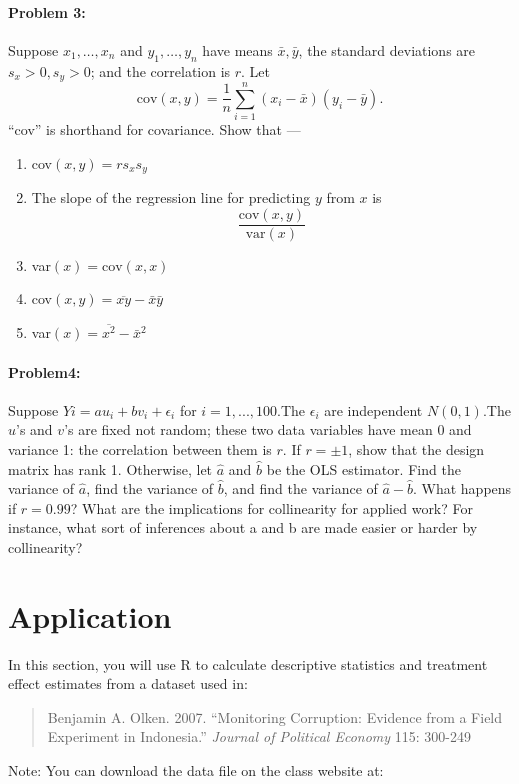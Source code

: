 \documentclass{article}
\begin{document}
\paragraph{Problem 3:}
\renewcommand{\theenumi}{\alph{enumi}}
Suppose $x_1, \ldots, x_n$ and $y_1,\ldots,y_n$ have means $\bar x, \bar y$, the standard deviations are $s_x>0, s_y>0$; and the correlation is $r$. Let
$$
\textrm{cov}(x,y) = \frac{1}{n}\sum_{i=1}^n (x_i - \bar x) (y_i - \bar y).
$$
``cov'' is shorthand for covariance. Show that ---
\begin{enumerate}
\item cov$(x,y) = rs_xs_y$
\item The slope of the regression line for predicting $y$ from $x$ is 
$$
\frac{\textrm{cov}(x,y)}{\textrm{var}(x)}
$$
\item var$(x)=\textrm{cov}(x,x)$
\item cov$(x,y) = \overline{xy} - \bar x \bar y$
\item var$(x) = \overline{x^2} -\bar x^2$
\end{enumerate}

\paragraph{Problem4:} 
\renewcommand{\theenumi}{\alph{enumi}} Suppose
$Yi=au_i+bv_i+\epsilon_i$ for $i=1,...,100$.The $\epsilon_i$ are
independent $N(0,1)$.The $u$’s and $v$’s are fixed not random; these
two data variables have mean 0 and variance 1: the correlation between
them is $r$. If $r = \pm 1$, show that the design matrix has rank
1. Otherwise, let $\hat{a}$ and $\hat{b}$ be the OLS estimator. Find
the variance of $\hat{a}$, find the variance of $\hat{b}$, and find
the variance of $\hat{a} - \hat{b}$. What happens if $r = 0.99$? What
are the implications for collinearity for applied work? For instance,
what sort of inferences about a and b are made easier or harder by
collinearity?

\section*{Application}
In this section, you will use R to calculate descriptive statistics
and treatment effect estimates from a dataset used in: 
\begin{quote}
  Benjamin A. Olken. 2007. ``Monitoring Corruption: Evidence from a
  Field Experiment in Indonesia.'' \textit{Journal of Political
    Economy} 115: 300-249
\end{quote}
Note: You can download the data file on the class website at:
\end{document}

